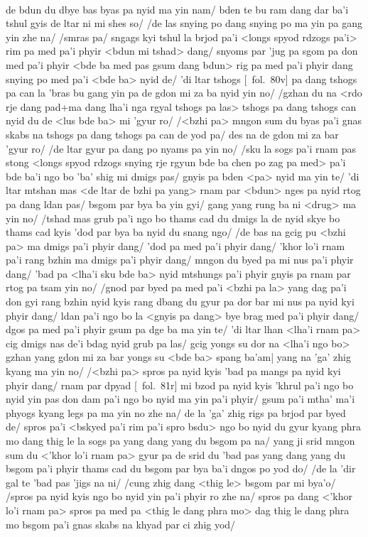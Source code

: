 \documentclass[12pt]{article}
\begin{document}
\textbf{\TVB}\\
de bdun du dbye bas byas pa nyid ma yin nam/ bden te bu ram dang dar ba'i tshul gyis de ltar ni mi shes so/ /de las snying po dang snying po ma yin pa gang yin zhe na/ /smras pa/ sngags kyi tshul la brjod pa'i <longs spyod rdzogs pa'i> rim pa med pa'i phyir <bdun mi tshad> dang/ snyoms par 'jug pa sgom pa don med pa'i phyir <bde ba med pas gsum dang bdun> rig pa med pa'i phyir dang snying po med pa'i <bde ba> nyid de/ 'di ltar tshogs [\TVB\ fol.\ 80v] pa dang tshogs pa can la 'bras bu gang yin pa de gdon mi za ba nyid yin no/ /gzhan du na <rdo rje dang pad+ma dang lha'i nga rgyal tshogs pa las> tshogs pa dang tshogs can nyid du de <lus bde ba> mi 'gyur ro/ /<bzhi pa> mngon sum du byas pa'i gnas skabs na tshogs pa dang tshogs pa can de yod pa/ des na de gdon mi za bar 'gyur ro/ /de ltar gyur pa dang po nyams pa yin no/ /sku la sogs pa'i rnam pas stong <longs spyod rdzogs snying rje rgyun bde ba chen po zag pa med> pa'i bde ba'i ngo bo 'ba' shig mi dmigs pas/ gnyis pa bden <pa> nyid ma yin te/ 'di ltar mtshan mas <de ltar de bzhi pa yang> rnam par <bdun> nges pa nyid rtog pa dang ldan pas/ bsgom par bya ba yin gyi/ gang yang rung ba ni <drug> ma yin no/ /tshad mas grub pa'i ngo bo thams cad du dmigs la de nyid skye bo thams cad kyis 'dod par bya ba nyid du snang ngo/ /de bas na gcig pu <bzhi pa> ma dmigs pa'i phyir dang/ 'dod pa med pa'i phyir dang/ 'khor lo'i rnam pa'i rang bzhin ma dmigs pa'i phyir dang/ mngon du byed pa mi nus pa'i phyir dang/ 'bad pa <lha'i sku bde ba> nyid mtshungs pa'i phyir gnyis pa rnam par rtog pa tsam yin no/ /gnod par byed pa med pa'i <bzhi pa la> yang dag pa'i don gyi rang bzhin nyid kyis rang dbang du gyur pa dor bar mi nus pa nyid kyi phyir dang/ ldan pa'i ngo bo la <gnyis pa dang> bye brag med pa'i phyir dang/ dgos pa med pa'i phyir gsum pa dge ba ma yin te/ 'di ltar lhan <lha'i rnam pa> cig dmigs nas de'i bdag nyid grub pa las/ gcig yongs su dor na <lha'i ngo bo> gzhan yang gdon mi za bar yongs su <bde ba> spang ba'am| yang na 'ga' zhig kyang ma yin no/ /<bzhi pa> spros pa nyid kyis 'bad pa mangs pa nyid kyi phyir dang/ rnam par dpyad [\TVB\ fol.\ 81r] mi bzod pa nyid kyis 'khrul pa'i ngo bo nyid yin pas don dam pa'i ngo bo nyid ma yin pa'i phyir/ gsum pa'i mtha' ma'i phyogs kyang legs pa ma yin no zhe na/ de la 'ga' zhig rigs pa brjod par byed de/ spros pa'i <bskyed pa'i rim pa'i spro bsdu> ngo bo nyid du gyur kyang phra mo dang thig le la sogs pa yang dang yang du bsgom pa na/ yang ji srid mngon sum du <'khor lo'i rnam pa> gyur pa de srid du 'bad pas yang dang yang du bsgom pa'i phyir thams cad du bsgom par bya ba'i dngos po yod do/ /de la 'dir gal te 'bad pas 'jigs na ni/ /cung zhig dang <thig le> bsgom par mi bya'o/ /spros pa nyid kyis ngo bo nyid yin pa'i phyir ro zhe na/ spros pa dang <'khor lo'i rnam pa> spros pa med pa <thig le dang phra mo> dag thig le dang phra mo bsgom pa'i gnas skabs na khyad par ci zhig yod/\\
\end{document}
